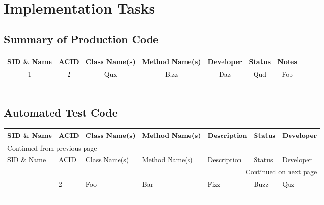 \documentclass[11pt]{article}
\begin{document}
\section{Implementation Tasks}
\label{sec:org028bfd1}
\subsection{Summary of Production Code}
\label{sec:org7313f2f}

\begin{center}
\begin{tabular}{|c|c|c|c|c|c|c|}
SID \& Name & ACID & Class Name(s) & Method Name(s) & Developer & Status & Notes\\
\hline
1 & 2 & Qux & Bizz & Daz & Qud & Foo\\
 &  &  &  &  &  & \\
 &  &  &  &  &  & \\
 &  &  &  &  &  & \\
 &  &  &  &  &  & \\
\end{tabular}
\end{center}

\subsection{Automated Test Code}
\label{sec:org8b67f6d}


\begin{longtable}{|l|l|p{2.5cm}|p{2.5cm}|p{2.5cm}|l|l|}
SID \& Name & ACID & Class Name(s) & Method Name(s) & Description & Status & Developer\\
\hline
\endfirsthead
\multicolumn{7}{l}{Continued from previous page} \\
\hline

SID \& Name & ACID & Class Name(s) & Method Name(s) & Description & Status & Developer \\

\hline
\endhead
\hline\multicolumn{7}{r}{Continued on next page} \\
\endfoot
\endlastfoot
\hline
1 & 2 & Foo & Bar & Fizz & Buzz & Quz\\
 &  &  &  &  &  & \\
 &  &  &  &  &  & \\
 &  &  &  &  &  & \\
 &  &  &  &  &  & \\
\end{longtable}
\end{document}
